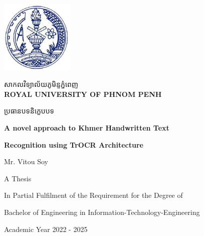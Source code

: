 \begin{titlepage}
    \centering
    \vspace*{1cm}

    \begin{minipage}{0.25\textwidth}
        \includegraphics[width=3.5cm]{figures/RUPP.jpg}
    \end{minipage}
    \hfill
    \begin{minipage}{0.7\textwidth}
        \raggedright
        {\khmerfont\fontsize{16pt}{20pt}\selectfont សាកលវិទ្យាល័យភូមិន្ទភ្នំពេញ\\[0.6em]}
        {\large\bfseries ROYAL UNIVERSITY OF PHNOM PENH}
    \end{minipage}

    \vspace{2cm}

    {\khmerfont\fontsize{16pt}{20pt}\selectfont ប្រធានបទនិក្ខេបបទ\\[0.4em]}
    {\englishfont\fontsize{16pt}{20pt}\selectfont\bfseries A novel approach to Khmer Handwritten Text \par}
    {\englishfont\fontsize{16pt}{20pt}\selectfont\bfseries Recognition using TrOCR Architecture \par}

    \vspace{3.0cm}

    {\englishfont\fontsize{16pt}{20pt}\selectfont Mr. Vitou Soy\par}

    \vspace{3.0cm}

    {\englishfont\fontsize{16pt}{20pt}\selectfont A Thesis\par}
    \vspace{0.5cm}
    {\large In Partial Fulfilment of the Requirement for the Degree of\par}
    {\large Bachelor of Engineering in Information-Technology-Engineering\par}
    {\large Academic Year 2022 - 2025\par}

    \vspace{2.5cm}


\end{titlepage}
